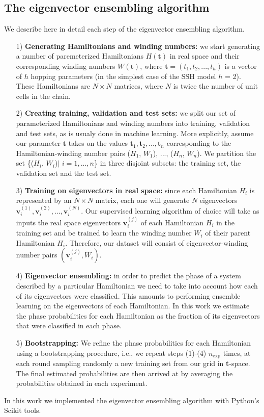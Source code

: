 \documentclass[fleqn,10pt]{wlscirep}
\begin{document}
\subsection*{The eigenvector ensembling algorithm}

We describe here in detail each step of the eigenvector ensembling algorithm.
\vspace{.3cm}
\begin{enumerate}[topsep=0pt, partopsep=0pt]
\item[1)] \textbf{Generating Hamiltonians and winding numbers:} we start generating a number of paremeterized Hamiltonians $H(\mathbf{t})$ in real space and their corresponding winding numbers $W(\mathbf{t})$, where $\mathbf{t} = (t_1, t_2,...,t_h)$ is a vector of $h$ hopping parameters (in the simplest case of the SSH model $h$ = 2). These Hamiltonians are $N\times N$ matrices, where $N$ is twice the number of unit cells in the chain.
\item[2)] \textbf{Creating training, validation and test sets:} we split our set of parameterized Hamiltonians and winding numbers into training, validation and test sets, as is usualy done in machine learning. More explicitly, assume our parameter $\mathbf{t}$ takes on the values $\mathbf{t}_1, \mathbf{t}_2, ..., \mathbf{t}_n$ corresponding to the Hamiltonian-winding number pairs ($H_1$, $W_1$), ..., ($H_n$, $W_n$). We partition the set \{($H_i$, $W_i$)$\mid$ $i=1,...,n$\} in three disjoint subsets: the training set, the validation set and the test set.
\item[3)] \textbf{Training on eigenvectors in real space:} since each Hamiltonian $H_i$ is represented by an $N\times N$ matrix, each one will generate $N$ eigenvectors $\mathbf{v}_i^{(1)}, \mathbf{v}_i^{(2)},...,\mathbf{v}_i^{(N)}$. Our supervised learning algorithm of choice will take as inputs the real space eigenvectors $\mathbf{v}^{(j)}_i$ of each Hamiltonian $H_i$ in the training set and be trained to learn the winding number $W_i$ of their parent Hamiltonian $H_i$. Therefore, our dataset will consist of eigenvector-winding number pairs $(\mathbf{v}_i^{(j)}, W_i)$.
\item[4)]\textbf{Eigenvector ensembling:} in order to predict the phase of a system described by a particular Hamiltonian we need to take into account how each of its eigenvectors were classified. This amounts to performing ensemble learning on the eigenvectors of each Hamiltonian. In this work we estimate the phase probabilities for each Hamiltonian as the fraction of its eigenvectors that were classified in each phase.
\item[5)] \textbf{Bootstrapping:} We refine the phase probabilities for each Hamiltonian using a bootstrapping procedure, i.e., we repeat steps (1)-(4) $n_\text{exp}$ times, at each round sampling randomly a new training set from our grid in \textbf{t}-space. The final estimated probabilities are then arrived at by averaging the probabilities obtained in each experiment.
\end{enumerate}
\vspace{.3cm}
In this work we implemented the eigenvector ensembling algorithm with Python's Scikit tools.
\end{document}
